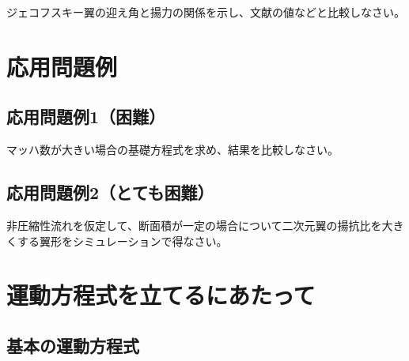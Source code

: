 \documentclass{article}
\begin{document}
ジェコフスキー翼の迎え角と揚力の関係を示し、文献の値などと比較しなさい。

\section{ 応用問題例 }

\subsection{ 応用問題例1（困難） }

マッハ数が大きい場合の基礎方程式を求め、結果を比較しなさい。

\subsection{ 応用問題例2（とても困難） }

非圧縮性流れを仮定して、断面積が一定の場合について二次元翼の揚抗比を大きくする翼形をシミュレーションで得なさい。

\section{ 運動方程式を立てるにあたって }

\subsection{ 基本の運動方程式 }
\end{document}

